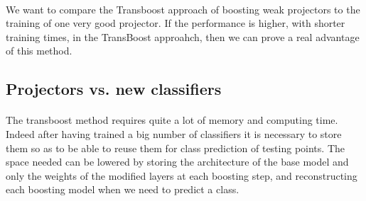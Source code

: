 \documentclass[11 pt]{article}
\begin{document}
\paragraph{}We want to compare the Transboost approach of boosting weak projectors to the training of one very good projector. If the performance is higher, with shorter training times, in the TransBoost approahch, then we can prove a real advantage of this method.

\subsection{Projectors vs. new classifiers}

\paragraph{}The transboost method requires quite a lot of memory and computing time. Indeed after having trained a big number of classifiers it is necessary to store them so as to be able to reuse them for class prediction of testing points. The space needed can be lowered by storing the architecture of the base model and only the weights of the modified layers at each boosting step, and reconstructing each boosting model when we need to predict a class.
\end{document}
